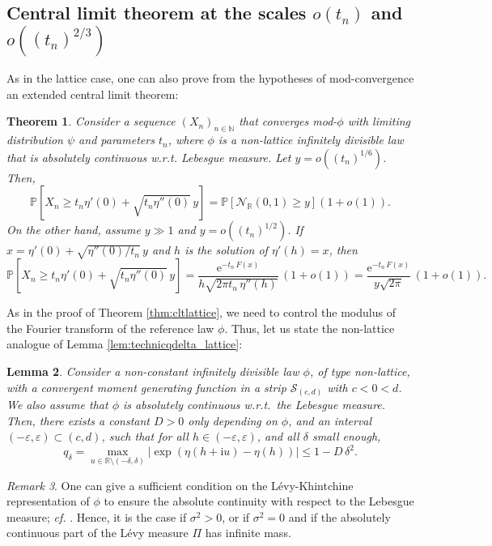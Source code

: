\documentclass[12pt,a4paper,reqno]{amsart}
\newtheorem{lemma}{Lemma}[section]
\newtheorem{theorem}[lemma]{Theorem}
\theoremstyle{remark}
\newtheorem{remark}[lemma]{Remark}
\newcommand{\N}{\mathbb{N}}
\newcommand{\R}{\mathbb{R}}
\newcommand{\E}{\mathrm{e}}
\newcommand{\I}{\mathrm{i}}
\newcommand{\proba}{\mathbb{P}}
\newcommand{\eps}{\varepsilon}
\begin{document}
\subsection{Central limit theorem at the scales \texorpdfstring{$o(t_n)$}{o(tn)} and \texorpdfstring{$o((t_n)^{2/3})$}{o(tn23)}}
As in the lattice case, one can also prove from the hypotheses of mod-convergence an extended central limit theorem:
 
\begin{theorem}\label{thm:cltnonlattice}
Consider a sequence $(X_n)_{n \in \N}$ that converges mod-$\phi$ with limiting distribution $\psi$ and parameters $t_n$, where $\phi$ is a non-lattice infinitely divisible law that is absolutely continuous w.r.t. Lebesgue measure.
Let $y=o((t_{n})^{1/6})$. Then,
$$\proba\!\left[X_{n}\geq t_{n}\eta'(0)+\sqrt{t_{n}\eta''(0)}\,y\right]=\proba[\mathcal{N}_{\R}(0,1)\geq y]\left(1+o(1)\right).$$
On the other hand, assume $y \gg 1$ and $y=o((t_n)^{1/2})$. If $x=\eta'(0)+\sqrt{\eta''(0)/t_n}\,y$ and $h$ is the solution of $\eta'(h)=x$, then
$$\proba\!\left[X_{n}\geq t_{n}\eta'(0)+\sqrt{t_{n}\eta''(0)}\,y\right]
= \frac{\E^{-t_n\,F(x)}}{h \sqrt{2\pi t_{n}\,\eta''(h)}}\,\left(1+o(1)\right)
= \frac{\E^{-t_n\,F(x)}}{y\sqrt{2\pi}}\,\left(1+o(1)\right).$$
\end{theorem}



As in the proof of Theorem \ref{thm:cltlattice}, we need to control the modulus of the Fourier transform of the reference law $\phi$. Thus, let us state the non-lattice analogue of Lemma \ref{lem:technicqdelta_lattice}:
\begin{lemma}\label{lem:technicqdelta_nonlattice}
Consider a non-constant infinitely divisible law $\phi$, of type non-lattice, with a convergent moment generating function in a strip $\mathcal{S}_{(c,d)}$ with $c<0<d$. We also assume that $\phi$ is absolutely continuous w.r.t.~the Lebesgue measure. Then, there exists a constant $D>0$ only depending on $\phi$, and an interval $(-\eps,\eps) \subset (c,d)$, such that for all $h \in (-\eps,\eps)$, and all $\delta$ small enough,
$$ q_\delta = \max_{u \in \R \setminus (-\delta,\delta)} |\exp(\eta(h+\I u)-\eta(h))| \leq 1-D\,\delta^2.$$
\end{lemma}

\begin{remark}
One can give a sufficient condition on the L\'evy-Khintchine representation of $\phi$ to ensure the absolute continuity with respect to the Lebesgue measure; \emph{cf.} \cite[Chapter 4, Theorem 4.23]{SVH04}. Hence, it is the case if $\sigma^2>0$, or if $\sigma^2=0$ and if the absolutely continuous part of the L\'evy measure $\Pi$ has infinite mass.
\end{remark}
\end{document}
